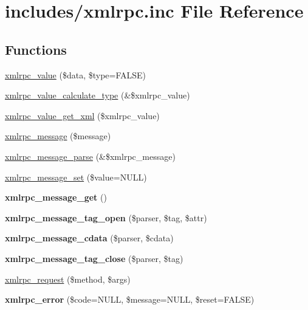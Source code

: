\hypertarget{xmlrpc_8inc}{
\section{includes/xmlrpc.inc File Reference}
\label{xmlrpc_8inc}
}
\subsection*{Functions}
\begin{CompactItemize}
\item 
\hyperlink{xmlrpc_8inc_f88c4a9120094b9280ddc4d90bc51987}{xmlrpc\_\-value} (\$data, \$type=FALSE)
\item 
\hyperlink{xmlrpc_8inc_3747d5c350b8db7126ccae2f6ae3e6ed}{xmlrpc\_\-value\_\-calculate\_\-type} (\&\$xmlrpc\_\-value)
\item 
\hyperlink{xmlrpc_8inc_d06538892136f5c1edb0580b2432e189}{xmlrpc\_\-value\_\-get\_\-xml} (\$xmlrpc\_\-value)
\item 
\hyperlink{xmlrpc_8inc_623f37020bfae3dec50facefc4cdcdac}{xmlrpc\_\-message} (\$message)
\item 
\hyperlink{xmlrpc_8inc_9dbb44df348197e48e26ce7c6e0c85a4}{xmlrpc\_\-message\_\-parse} (\&\$xmlrpc\_\-message)
\item 
\hyperlink{xmlrpc_8inc_82e3428ca6ed8e4d1ddc377fbc77d8dc}{xmlrpc\_\-message\_\-set} (\$value=NULL)
\item 
\hypertarget{xmlrpc_8inc_8ee9baa0e35c9f75da4705403ec1c502}{
\textbf{xmlrpc\_\-message\_\-get} ()}
\label{xmlrpc_8inc_8ee9baa0e35c9f75da4705403ec1c502}

\item 
\hypertarget{xmlrpc_8inc_f6f1ebfc3ddbd60f36e1058b1cb257de}{
\textbf{xmlrpc\_\-message\_\-tag\_\-open} (\$parser, \$tag, \$attr)}
\label{xmlrpc_8inc_f6f1ebfc3ddbd60f36e1058b1cb257de}

\item 
\hypertarget{xmlrpc_8inc_74f16ef34915c5b73e28a69a02e773c8}{
\textbf{xmlrpc\_\-message\_\-cdata} (\$parser, \$cdata)}
\label{xmlrpc_8inc_74f16ef34915c5b73e28a69a02e773c8}

\item 
\hypertarget{xmlrpc_8inc_ee4cd82346eac26c40587fc89cddb02f}{
\textbf{xmlrpc\_\-message\_\-tag\_\-close} (\$parser, \$tag)}
\label{xmlrpc_8inc_ee4cd82346eac26c40587fc89cddb02f}

\item 
\hyperlink{xmlrpc_8inc_21b3f792f935fd99fc444c82493aaca9}{xmlrpc\_\-request} (\$method, \$args)
\item 
\hypertarget{xmlrpc_8inc_abf20dbe18bd511ce0aceedc087a15fd}{
\textbf{xmlrpc\_\-error} (\$code=NULL, \$message=NULL, \$reset=FALSE)}
\label{xmlrpc_8inc_abf20dbe18bd511ce0aceedc087a15fd}


\end{CompactItemize}
